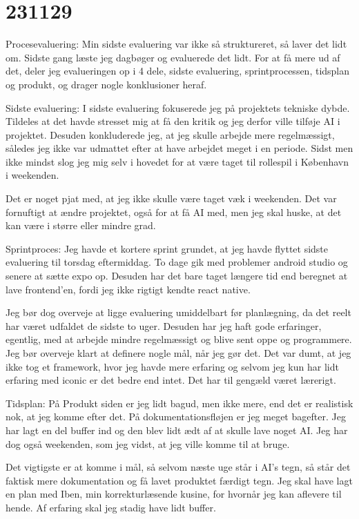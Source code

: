\documentclass{report}
\begin{document}
\section{231129}
Procesevaluering:
Min sidste evaluering var ikke så struktureret, så laver det lidt om. Sidste gang læste jeg dagbøger og evaluerede det lidt.
For at få mere ud af det, deler jeg evalueringen op i 4 dele, sidste evaluering, sprintprocessen, tidsplan og produkt, og drager nogle konklusioner heraf.
 
Sidste evaluering:
I sidste evaluering fokuserede jeg på projektets tekniske dybde. Tildeles at det havde stresset mig at få den kritik og jeg derfor ville tilføje AI i projektet.
Desuden konkluderede jeg, at jeg skulle arbejde mere regelmæssigt, således jeg ikke var udmattet efter at have arbejdet meget i en periode.
Sidst men ikke mindst slog jeg mig selv i hovedet for at være taget til rollespil i København i weekenden.
 
Det er noget pjat med, at jeg ikke skulle være taget væk i weekenden.
Det var fornuftigt at ændre projektet, også for at få AI med, men jeg skal huske, at det kan være i større eller mindre grad.
 
Sprintproces:
Jeg havde et kortere sprint grundet, at jeg havde flyttet sidste evaluering til torsdag eftermiddag.
To dage gik med problemer android studio og senere at sætte expo op.
Desuden har det bare taget længere tid end beregnet at lave frontend’en, fordi jeg ikke rigtigt kendte react native.
 
Jeg bør dog overveje at ligge evaluering umiddelbart før planlægning, da det reelt har været udfaldet de sidste to uger.
Desuden har jeg haft gode erfaringer, egentlig, med at arbejde mindre regelmæssigt og blive sent oppe og programmere. Jeg bør overveje klart at definere nogle mål, når jeg gør det.
Det var dumt, at jeg ikke tog et framework, hvor jeg havde mere erfaring og selvom jeg kun har lidt erfaring med iconic er det bedre end intet. Det har til gengæld været lærerigt.
 
Tidsplan:
På Produkt siden er jeg lidt bagud, men ikke mere, end det er realistisk nok, at jeg komme efter det.
På dokumentationsfløjen er jeg meget bagefter.
Jeg har lagt en del buffer ind og den blev lidt ædt af at skulle lave noget AI.
Jeg har dog også weekenden, som jeg vidst, at jeg ville komme til at bruge.
 
Det vigtigste er at komme i mål, så selvom næste uge står i AI's tegn, så står det faktisk mere dokumentation og få lavet produktet færdigt tegn.
Jeg skal have lagt en plan med Iben, min korrekturlæsende kusine, for hvornår jeg kan aflevere til hende.
Af erfaring skal jeg stadig have lidt buffer.
 
\end{document}
